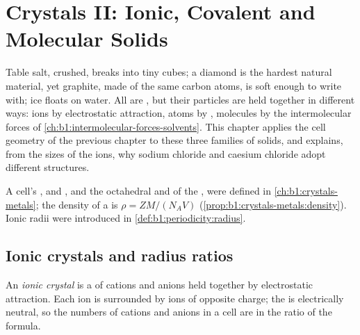 \chapter{Crystals II: Ionic, Covalent and Molecular Solids}\label{ch:b1:crystals-ionic-covalent}

Table salt, crushed, breaks into tiny cubes; a diamond is the hardest
natural material, yet graphite, made of the same carbon atoms, is soft
enough to write with; ice floats on water. All are , but their
particles are held together in different ways: ions by electrostatic
attraction, atoms by , molecules by the intermolecular
forces of \cref{ch:b1:intermolecular-forces-solvents}. This chapter
applies the cell geometry of the previous chapter to these three families
of solids, and explains, from the sizes of the ions, why sodium chloride
and caesium chloride adopt different structures.

\begin{recall}
A cell's ,  and , and the
octahedral and  of the  , were
defined in \cref{ch:b1:crystals-metals}; the density of a  is
$\rho = ZM/(N_A V)$ (\cref{prop:b1:crystals-metals:density}). Ionic radii
were introduced in \cref{def:b1:periodicity:radius}.
\end{recall}

\section{Ionic crystals and radius ratios}

\begin{definition}\label{def:b1:crystals-ionic-covalent:ionic-crystal}
An \emph{ionic crystal} is a  of cations and
anions held together by electrostatic attraction. Each ion is surrounded
by ions of opposite charge; the  is electrically neutral, so the
numbers of cations and anions in a cell are in the ratio of the formula.
\end{definition}

